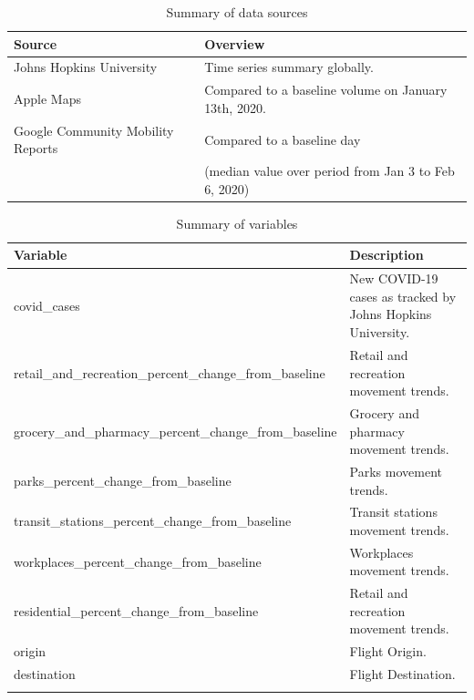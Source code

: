 \documentclass[titlepage,oneside,12pt]{article}
\newcommand{\?}{\stackrel{?}{=}}
\begin{document}
\begin{table}[h!]\small
  \centering
  \caption{Summary of data sources}
  \label{tab:sources}
\begin{tabular}{ll}\toprule
\bf Source                         & \bf Overview                                                                              \\\midrule
Johns Hopkins University          & Time series summary globally.                                                               \\
Apple Maps                        & Compared to a baseline volume on January 13th, 2020.                                          \\
  Google Community Mobility Reports & Compared to a baseline day \\
  & (median value over period from Jan 3 to Feb 6, 2020)\\\bottomrule
\end{tabular}
\end{table}

\begin{table}[h!]
  \centering
\caption{Summary of variables}
\label{tab:variables}
\small
\begin{tabular}{ll}\toprule
\textbf{Variable}                                         & \textbf{Description}                                    \\\midrule
covid\_cases & New COVID-19 cases as tracked by Johns Hopkins University. \\
retail\_and\_recreation\_percent\_change\_from\_baseline & Retail and recreation movement trends.            \\
grocery\_and\_pharmacy\_percent\_change\_from\_baseline  & Grocery and pharmacy movement trends.             \\
parks\_percent\_change\_from\_baseline                   & Parks movement trends.                           \\
transit\_stations\_percent\_change\_from\_baseline       & Transit stations movement trends.                \\
workplaces\_percent\_change\_from\_baseline              & Workplaces movement trends.                      \\
residential\_percent\_change\_from\_baseline             & Retail and recreation movement trends. \\
origin & Flight Origin. \\
destination & Flight Destination. \\
\\\bottomrule
\end{tabular}
\end{table}
\end{document}
